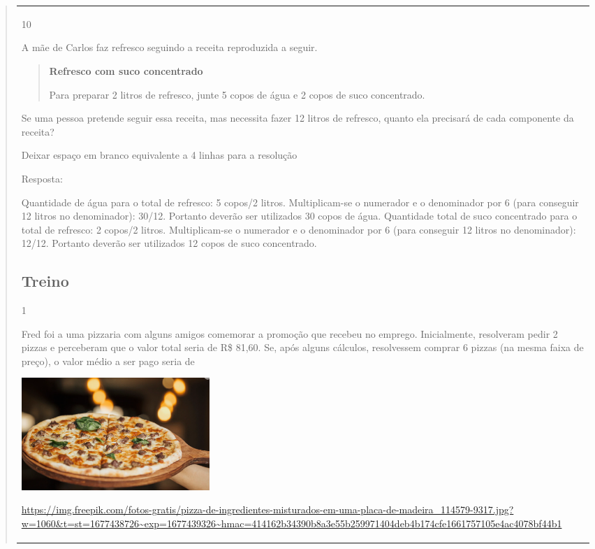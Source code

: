 \begin{mdframed}[linewidth=2pt,linecolor=salmao,roundcorner=2pt]
\begin{itemize}
{\begin{itemize}
\begin{escolha}
{\begin{quote}
{\begin{escolha}
{{{{{\begin{longtable}[]{@{}l@{}}
\begin{itemize}
\num{10}

A mãe de Carlos faz refresco seguindo a receita reproduzida a seguir.

\begin{quote}
\textbf{Refresco com suco concentrado}

Para preparar 2 litros de refresco, junte 5 copos de água e 2 copos de suco concentrado.
\end{quote}

Se uma pessoa pretende seguir essa receita, mas necessita fazer 12
litros de refresco, quanto ela precisará de cada componente da receita?

Deixar espaço em branco equivalente a 4 linhas para a resolução

Resposta:

Quantidade de água para o total de refresco: 5 copos/2 litros.
Multiplicam-se o numerador e o denominador por 6 (para conseguir 12 litros no denominador): 30/12.
Portanto deverão ser utilizados 30 copos de água.
Quantidade total de suco concentrado para o total de refresco: 2 copos/2 litros.
Multiplicam-se o numerador e o denominador por 6 (para conseguir 12 litros no denominador): 12/12.
Portanto deverão ser utilizados 12 copos de suco concentrado.

\subsection{Treino}

\num{1}

Fred foi a uma pizzaria com alguns amigos comemorar a promoção que recebeu no emprego.
Inicialmente, resolveram pedir 2 pizzas e perceberam que o valor total
seria de R\$ 81,60. Se, após alguns cálculos, resolvessem comprar 6
pizzas (na mesma faixa de preço), o valor médio a ser pago seria de

\includegraphics[width=2.80000in,height=1.66867in]{media/image132.png}

\url{https://img.freepik.com/fotos-gratis/pizza-de-ingredientes-misturados-em-uma-placa-de-madeira_114579-9317.jpg?w=1060\&t=st=1677438726~exp=1677439326~hmac=414162b34390b8a3e55b259971404deb4b174cfe1661757105e4ac4078bf44b1}


\end{itemize}
\end{longtable}}}}}}
\end{escolha}}
\end{quote}}
\end{escolha}
\end{itemize}}
\end{itemize}
\end{mdframed}

